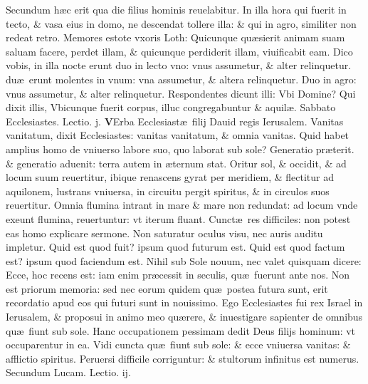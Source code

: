 \documentclass[a5paper,10pt]{book}
\def\ae{æ}
\begin{document}
\begin{multicols*}{2}
Secundum h\ae c erit qua die filius hominis reuelabitur.
In illa hora qui fuerit in tecto, \& vasa eius in domo, ne descendat tollere illa: \& qui in agro, similiter non redeat retro.
Memores estote vxoris Loth: Quicunque qu\ae sierit animam suam saluam facere, perdet illam, \& quicunque perdiderit illam, viuificabit eam.
Dico vobis, in illa nocte erunt duo in lecto vno: vnus assumetur, \& alter relinquetur. du\ae \ erunt molentes in vnum: vna assumetur, \& altera relinquetur. Duo in agro: vnus assumetur, \& alter relinquetur.
Respondentes dicunt illi: Vbi Domine? Qui dixit illis, Vbicunque fuerit corpus, illuc congregabuntur \& aquil\ae .
\newline {} \color{red} \hypertarget{SAT-SECVNDA-POST-ADV}{Sabbato} Ecclesiastes. \hfill Lectio. j. \color{black}
\vspace{-1.25em}
\lettrine[lines=2]{\bfseries V}{}Erba Ecclesiast\ae \ filij Dauid regis Ierusalem. Vanitas vanitatum, dixit Ecclesiastes: vanitas vanitatum, \& omnia vanitas.
Quid habet amplius homo de vniuerso labore suo, quo laborat sub sole? Generatio pr\ae terit. \& generatio aduenit: terra autem in \ae ternum stat.
Oritur sol, \& occidit, \& ad locum suum reuertitur, ibique renascens gyrat per meridiem, \& flectitur ad aquilonem, lustrans vniuersa, in circuitu pergit spiritus, \& in circulos suos reuertitur.
Omnia flumina intrant in mare \& mare non redundat: ad locum vnde exeunt flumina, reuertuntur: vt iterum fluant.
Cunct\ae \ res difficiles: non potest eas homo explicare sermone. Non saturatur oculus visu, nec auris auditu impletur.
Quid est quod fuit? ipsum quod futurum est. Quid est quod factum est? ipsum quod faciendum est. Nihil sub Sole nouum, nec valet quisquam dicere: Ecce, hoc recens est: iam enim pr\ae cessit in seculis, qu\ae \ fuerunt ante nos.
Non est priorum memoria: sed nec eorum quidem qu\ae \ postea futura sunt, erit recordatio apud eos qui futuri sunt in nouissimo.
Ego Ecclesiastes fui rex Israel in Ierusalem, \& proposui in animo meo qu\ae rere, \& inuestigare sapienter de omnibus qu\ae \ fiunt sub sole.
Hanc occupationem pessimam dedit Deus filijs hominum: vt
occuparentur in ea.
Vidi cuncta qu\ae \ fiunt sub sole: \& ecce vniuersa vanitas: \& afflictio spiritus. Peruersi difficile corriguntur: \& stultorum infinitus est numerus.
\fancyhead[C]{\color{red} Sabbato Dominic\ae . ij. post aduentum}
\newline \color{red} Secundum Lucam. \hfill Lectio. ij. \color{black}
\vspace{-.25em}

\end{multicols*}
\end{document}
